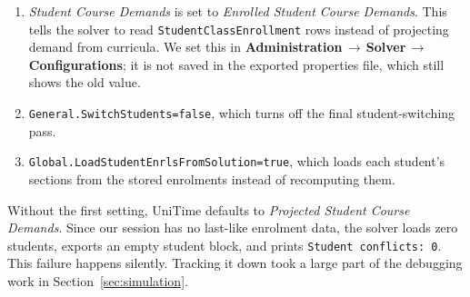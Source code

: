 \begin{enumerate}
  \item \emph{Student Course Demands} is set to \emph{Enrolled Student Course Demands}.
    This tells the solver to read \texttt{StudentClassEnrollment} rows instead of projecting demand from curricula.
    We set this in \textbf{Administration\,$\rightarrow$\,Solver\,$\rightarrow$\,Configurations}; it is not saved in the exported properties file, which still shows the old value.
  \item \texttt{General.SwitchStudents=false}, which turns off the final student-switching pass.
  \item \texttt{Global.LoadStudentEnrlsFromSolution=true}, which loads each student's sections from the stored enrolments instead of recomputing them.
\end{enumerate}

Without the first setting, UniTime defaults to \emph{Projected Student Course Demands}.
Since our session has no last-like enrolment data, the solver loads zero students, exports an empty student block, and prints \texttt{Student conflicts: 0}.
This failure happens silently.
Tracking it down took a large part of the debugging work in Section~\ref{sec:simulation}.
